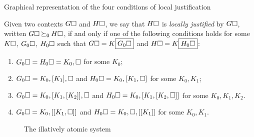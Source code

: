 \begin{marginfigure}
  
  \caption{Graphical representation of the four conditions of local
  justification}
\end{marginfigure}

\begin{definition}

  Given two contexts $G\square$ and $H\square$, we say that $H\square$ is
  \emph{locally justified} by $G\square$, written $G\square \mathbin{\succeq_0} H\square$, if and
  only if one of the following conditions holds for some $K\square$, $G_0\square$,
  $H_0\square$ such that $G\square = K\fbox{$G_0\square$}$ and $H\square =
  K\fbox{$H_0\square$}$:
  \begin{enumerate}
    \item $G_0\square = H_0\square = K_0, \square$ for some $K_0$;
    \item $G_0\square = K_0, [K_1], \square$ and $H_0\square = K_0, [K_1, \square]$ for
    some $K_0, K_1$;
    \item $G_0\square = K_0, [K_1, [K_2]], \square$ and $H_0\square = K_0, [K_1, [K_2,
    \square]]$ for some $K_0, K_1, K_2$.
    \item $G_0\square = K_0, [[K_1, \square]]$ and $H_0\square = K_0, \square, [[K_1]]$
    for some $K_0, K_1$.
  \end{enumerate}
\end{definition}

\begin{figure}
  
  \caption{The illatively atomic system }
\end{figure}

